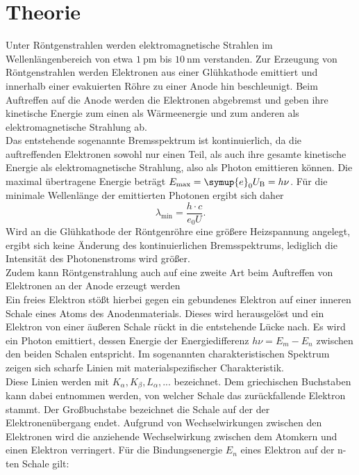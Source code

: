 \section{Theorie}
\label{sec:Theorie}
Unter Röntgenstrahlen werden elektromagnetische Strahlen im Wellenlängenbereich von etwa $\SI{1}{\pico\meter}$ bis $\SI{10}{\nano\meter}$ verstanden.
Zur Erzeugung von Röntgenstrahlen werden Elektronen aus einer Glühkathode emittiert und innerhalb einer evakuierten Röhre zu einer Anode hin beschleunigt.
Beim Auftreffen auf die Anode werden die Elektronen abgebremst und geben ihre kinetische Energie zum einen als Wärmeenergie und zum anderen als elektromagnetische Strahlung ab.\\
Das entstehende sogenannte Bremsspektrum ist kontinuierlich, da die auftreffenden Elektronen sowohl nur einen Teil, als auch ihre gesamte kinetische Energie als elektromagnetische Strahlung, also als Photon emittieren können.
Die maximal übertragene Energie beträgt $E_\mathrm{max}=\symup{e}_0U_\mathrm{B}=h\nu$.
Für die minimale Wellenlänge der emittierten Photonen ergibt sich daher
\begin{equation}
  \label{eqn:welle}
  \lambda_\mathrm{min}=\frac{h\cdot c}{e_0U} \text{.}
\end{equation}
Wird an die Glühkathode der Röntgenröhre eine größere Heizspannung angelegt, ergibt sich keine Änderung des kontinuierlichen Bremsspektrums, lediglich die Intensität des Photonenstroms wird größer.\\
Zudem kann Röntgenstrahlung auch auf eine zweite Art beim Auftreffen von Elektronen an der Anode erzeugt werden\\
Ein freies Elektron stößt hierbei gegen ein gebundenes Elektron auf einer inneren Schale eines Atoms des Anodenmaterials.
Dieses wird herausgelöst und ein Elektron von einer äußeren Schale rückt in die entstehende Lücke nach. Es wird ein Photon emittiert, dessen Energie der Energiedifferenz $h\nu=E_m-E_n$ zwischen den beiden Schalen entspricht.
Im sogenannten charakteristischen Spektrum zeigen sich scharfe Linien mit materialspezifischer Charakteristik.\\
Diese Linien werden mit $K_\alpha,K_\beta,L_\alpha,...$ bezeichnet. Dem griechischen Buchstaben kann dabei entnommen werden, von welcher Schale das zurückfallende Elektron
stammt. Der Großbuchstabe bezeichnet die Schale auf der der Elektronenübergang endet.
Aufgrund von Wechselwirkungen zwischen den Elektronen wird die anziehende Wechselwirkung zwischen dem Atomkern und einen Elektron verringert.
Für  die Bindungsenergie $E_n$ eines Elektron auf der n-ten Schale gilt:
